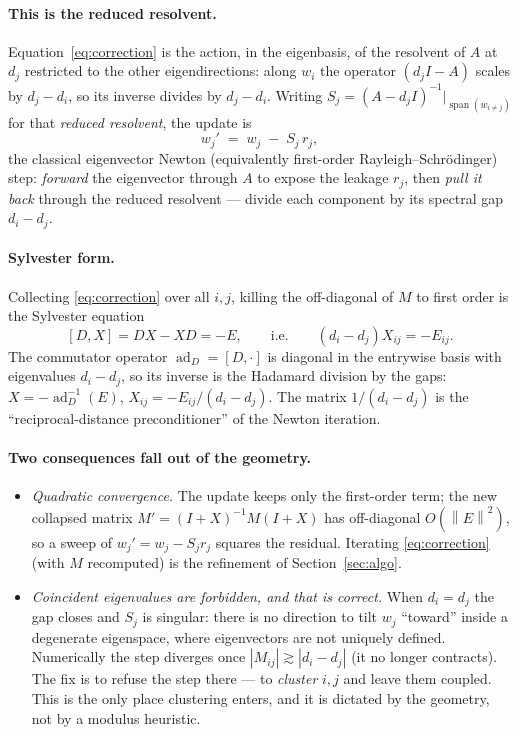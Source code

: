 \documentclass[11pt,a4paper]{article}
\newcommand{\norm}[1]{\left\|#1\right\|}
\newcommand{\abs}[1]{\left|#1\right|}
\DeclareMathOperator{\ad}{ad}
\theoremstyle{plain}
\theoremstyle{definition}
\begin{document}
\paragraph{This is the reduced resolvent.} Equation~\eqref{eq:correction} is the
action, in the eigenbasis, of the resolvent of $A$ at $d_j$ restricted to the other
eigendirections: along $w_i$ the operator $(d_jI-A)$ scales by $d_j-d_i$, so its
inverse divides by $d_j-d_i$. Writing $S_j = (A-d_jI)^{-1}\big|_{\operatorname{span}(w_{i\ne j})}$
for that \emph{reduced resolvent}, the update is
\[
  w_j' \;=\; w_j \;-\; S_j\, r_j,
\]
the classical eigenvector Newton (equivalently first-order Rayleigh--Schr\"odinger)
step: \emph{forward} the eigenvector through $A$ to expose the leakage $r_j$, then
\emph{pull it back} through the reduced resolvent --- divide each component by its
spectral gap $d_i-d_j$.

\paragraph{Sylvester form.} Collecting \eqref{eq:correction} over all $i,j$, killing
the off-diagonal of $M$ to first order is the Sylvester equation
\begin{equation}\label{eq:sylvester}
  [D,X] = DX-XD = -E,\qquad\text{i.e.}\qquad (d_i-d_j)X_{ij} = -E_{ij}.
\end{equation}
The commutator operator $\ad_D = [D,\cdot]$ is diagonal in the entrywise basis with
eigenvalues $d_i-d_j$, so its inverse is the Hadamard division by the gaps:
$X = -\ad_D^{-1}(E)$, $X_{ij}=-E_{ij}/(d_i-d_j)$. The matrix $1/(d_i-d_j)$ is the
``reciprocal-distance preconditioner'' of the Newton iteration.

\paragraph{Two consequences fall out of the geometry.}
\begin{itemize}
  \item \emph{Quadratic convergence.} The update keeps only the first-order term; the
    new collapsed matrix $M'=(I+X)^{-1}M(I+X)$ has off-diagonal $O(\norm{E}^2)$, so a
    sweep of $w_j' = w_j - S_jr_j$ squares the residual. Iterating
    \eqref{eq:correction} (with $M$ recomputed) is the refinement of
    Section~\ref{sec:algo}.
  \item \emph{Coincident eigenvalues are forbidden, and that is correct.} When
    $d_i=d_j$ the gap closes and $S_j$ is singular: there is no direction to tilt $w_j$
    ``toward'' inside a degenerate eigenspace, where eigenvectors are not uniquely
    defined. Numerically the step diverges once $\abs{M_{ij}}\gtrsim\abs{d_i-d_j}$ (it
    no longer contracts). The fix is to refuse the step there --- to \emph{cluster}
    $i,j$ and leave them coupled. This is the only place clustering enters, and it is
    dictated by the geometry, not by a modulus heuristic.
\end{itemize}
\end{document}
